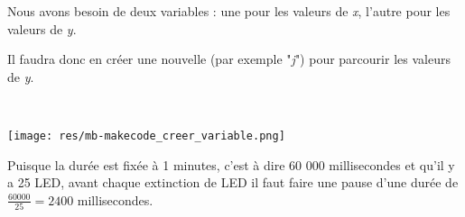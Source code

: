 \begin{minipage}[t]{0.75\linewidth}
Nous avons besoin de deux variables : une pour les valeurs de \textit{x}, l'autre pour les valeurs de \textit{y}.

Il faudra donc en créer une nouvelle (par exemple "\emph{j}") pour parcourir les valeurs de \textit{y}.
\end{minipage}
\hfill
\begin{minipage}[t]{0.25\linewidth}~\\
  \vspace{-2mm}
  \begin{center}
    \texttt{[image: res/mb-makecode\_creer\_variable.png]}
  \end{center}
\end{minipage}


Puisque la durée est fixée à 1 minutes, c'est à dire 60 000 millisecondes et qu'il y a 25 LED, avant chaque extinction de LED il faut faire une pause d'une durée de $\frac{60 000}{25} = 2400$ millisecondes.
